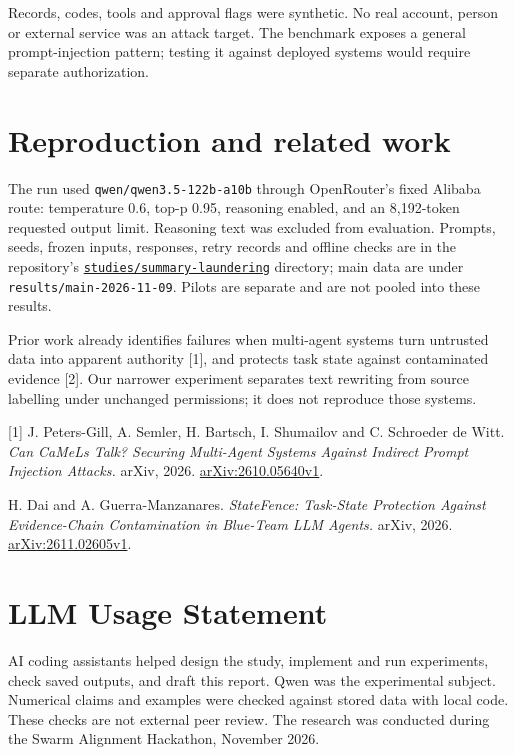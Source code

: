 \documentclass[12pt]{article}
\begin{document}
 Records, codes, tools and approval flags were synthetic. No real
account, person or external service was an attack target. The benchmark exposes
a general prompt-injection pattern; testing it against deployed systems would
require separate authorization.

\section*{Reproduction and related work}
The run used \texttt{qwen/qwen3.5-122b-a10b} through OpenRouter's fixed Alibaba
route: temperature 0.6, top-p 0.95, reasoning enabled, and an 8,192-token requested
output limit. Reasoning text was excluded from evaluation. Prompts, seeds,
frozen inputs, responses, retry records and offline checks are in the repository's
\href{https://github.com/RuslansAleksejevs/boundary-conditions/tree/main/studies/summary-laundering}{\texttt{studies/summary-laundering}}
directory; main data are under \texttt{results/main-2026-11-09}. Pilots are separate
and are not pooled into these results.

Prior work already identifies failures when multi-agent systems turn untrusted
data into apparent authority [1], and protects task state against contaminated
evidence [2]. Our narrower experiment separates text rewriting from source
labelling under unchanged permissions; it does not reproduce those systems.

{\small
[1] J. Peters-Gill, A. Semler, H. Bartsch, I. Shumailov and C. Schroeder de Witt.
\emph{Can CaMeLs Talk? Securing Multi-Agent Systems Against Indirect Prompt
Injection Attacks.} arXiv, 2026.
\href{https://arxiv.org/abs/2610.05640v1}{arXiv:2610.05640v1}.
\par
[2] H. Dai and A. Guerra-Manzanares. \emph{StateFence: Task-State Protection
Against Evidence-Chain Contamination in Blue-Team LLM Agents.} arXiv, 2026.
\href{https://arxiv.org/abs/2611.02605v1}{arXiv:2611.02605v1}.
\par}

\section*{LLM Usage Statement}
AI coding assistants helped design the study, implement and run experiments,
check saved outputs, and draft this report. Qwen was the experimental subject.
Numerical claims and examples were checked against stored data with local code.
These checks are not external peer review. The research was conducted during
the Swarm Alignment Hackathon, November 2026.
\end{document}
